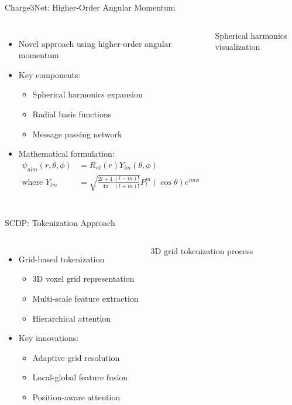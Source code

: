 \documentclass[aspectratio=169]{beamer}
\begin{document}
\begin{frame}{Charge3Net: Higher-Order Angular Momentum}
    \begin{columns}
        \begin{itemize}
            \item Novel approach using higher-order angular momentum
            \item Key components:
            \begin{itemize}
                \item Spherical harmonics expansion
                \item Radial basis functions
                \item Message passing network
            \end{itemize}
            \item Mathematical formulation:
            \begin{align*}
                \psi_{nlm}(r,\theta,\phi) &= R_{nl}(r)Y_{lm}(\theta,\phi) \\
                \text{where } Y_{lm} &= \sqrt{\frac{2l+1}{4\pi}\frac{(l-m)!}{(l+m)!}}P_l^m(\cos\theta)e^{im\phi}
            \end{align*}
        \end{itemize}
        Spherical harmonics visualization
    \end{columns}
\end{frame}

\begin{frame}{SCDP: Tokenization Approach}
    \begin{columns}
        \begin{itemize}
            \item Grid-based tokenization
            \begin{itemize}
                \item 3D voxel grid representation
                \item Multi-scale feature extraction
                \item Hierarchical attention
            \end{itemize}
            \item Key innovations:
            \begin{itemize}
                \item Adaptive grid resolution
                \item Local-global feature fusion
                \item Position-aware attention
            \end{itemize}
        \end{itemize}
        3D grid tokenization process
    \end{columns}
\end{frame}
\end{document}
